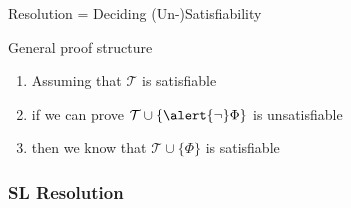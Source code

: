 \documentclass[presentation]{beamer}\mode<presentation>{\usetheme{AMSBolognaFC}}
\begin{document}
\begin{frame}[allowframebreaks]{Resolution = Deciding (Un-)Satisfiability}
    \begin{exampleblock}{General proof structure}
        \begin{enumerate}
            \item Assuming that $\mathcal{T}$ is satisfiable
            
            \item if we can prove $\mathcal{T} \cup \{ \alert{\neg} \Phi \}$ is unsatisfiable
            
            \item then we know that $\mathcal{T} \cup \{ \Phi \}$ is satisfiable
        \end{enumerate}
    \end{exampleblock}
\end{frame}

\subsubsection{SL Resolution}
\end{document}
